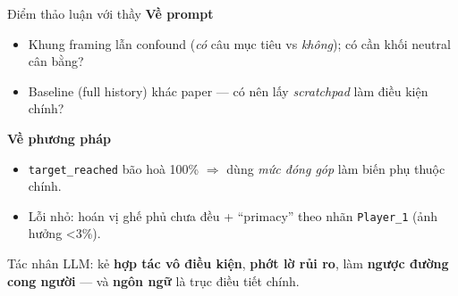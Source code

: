 \documentclass[aspectratio=169,10pt]{beamer}
\begin{document}
\begin{frame}{Điểm thảo luận với thầy}
  \textbf{Về prompt}
  \begin{itemize}\setlength\itemsep{2pt}
    \item Khung framing lẫn confound (\emph{có} câu mục tiêu vs \emph{không}); có cần khối neutral cân bằng?
    \item Baseline (full history) khác paper --- có nên lấy \emph{scratchpad} làm điều kiện chính?
  \end{itemize}
  \smallskip
  \textbf{Về phương pháp}
  \begin{itemize}\setlength\itemsep{2pt}
    \item \texttt{target\_reached} bão hoà 100\% $\Rightarrow$ dùng \emph{mức đóng góp} làm biến phụ thuộc chính.
    \item Lỗi nhỏ: hoán vị ghế phủ chưa đều + ``primacy'' theo nhãn \texttt{Player\_1} (ảnh hưởng <3\%).
  \end{itemize}
\end{frame}

\begin{frame}[standout]
  Tác nhân LLM: kẻ \textbf{hợp tác vô điều kiện}, \textbf{phớt lờ rủi ro}, làm \textbf{ngược đường cong người} --- và \textbf{ngôn ngữ} là trục điều tiết chính.
\end{frame}
\end{document}
